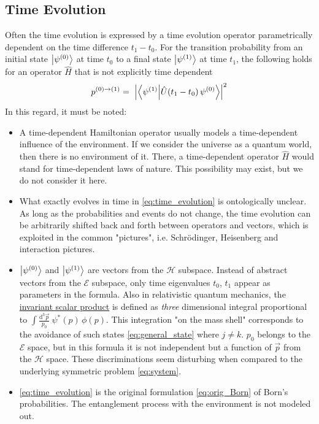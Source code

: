 \documentclass[12pt]{article}
\begin{document}
\subsection{Time Evolution}
Often the time evolution is expressed by a time evolution operator parametrically dependent on the time difference $t_1-t_0$. For the transition probability from an initial state $\ket{\psi^{(0)}}$ at time $t_0$ to a final state $\ket{\psi^{(1)}}$ at time $t_1$, the following holds for an operator $\hat{H}$ that is not explicitly time dependent
\begin{equation} 
\label{eq:time_evolution}
p^{(0)\rightarrow(1)} =\ \Bigl| \bra{\psi^{(1)}}\ket{\hat{U}(t_1-t_0)\,\psi^{(0)}} \Bigr|^2
\end{equation}
In this regard, it must be noted:
\begin{itemize}
\item A time-dependent Hamiltonian operator usually models a time-dependent influence of the environment. If we consider the universe as a quantum world, then there is no environment of it. There, a time-dependent operator $\hat{H}$ would stand for time-dependent laws of nature. This possibility may exist, but we do not consider it here.
\item What exactly evolves in time in \eqref{eq:time_evolution} is ontologically unclear. As long as the probabilities and events do not change, the time evolution can be arbitrarily shifted back and forth between operators and vectors, which is exploited in the common "pictures", i.e. Schrödinger, Heisenberg and interaction pictures.
\item $\ket{\psi^{(0)}}$ and $\ket{\psi^{(1)}}$ are vectors from the $\mathscr{H}$ subspace. Instead of abstract vectors from the $\mathscr{E}$ subspace, only time eigenvalues $t_0$, $t_1$ appear as parameters in the formula. Also in relativistic quantum mechanics, the \href{http://www.itp.uni-bremen.de/~noack/dirac.pdf}{invariant scalar product} is defined as \emph{three} dimensional integral proportional to 
$\int \frac{\mathrm{d}^3 \vec{p}}{p_0}\ \psi^*(p)\, \phi(p)$. This integration "on the mass shell" corresponds to the avoidance of such states \eqref{eq:general_state} where $j \neq k$. $p_0$ belongs to the $\mathscr{E}$ space, but in this formula it is not independent but a function of $\vec{p}$ from the $\mathscr{H}$ space. These discriminations seem disturbing when compared to the underlying symmetric problem \eqref{eq:system}.
\item \eqref{eq:time_evolution} is the original formulation \eqref{eq:orig_Born} of Born's probabilities. The entanglement process with the environment is not modeled out.
\end{itemize}
\end{document}
